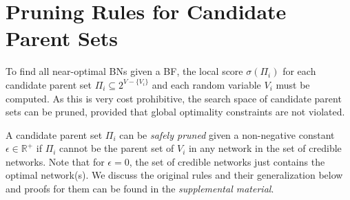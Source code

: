 \documentclass[letterpaper]{article}
\newcommand{\vertex}[1]{V_{#1}}
\newcommand{\vertices}{\mathit{V}}
\newcommand{\parents}{\Pi}
\begin{document}
\section{Pruning Rules for Candidate Parent Sets}\label{sec:pruning}

To find all near-optimal BNs given a BF, the local score $\sigma( \parents_{i} )$
for each candidate parent set
$\parents_{i} \subseteq 2^{\vertices - \{\vertex{i}\}}$
and each random variable $\vertex{i}$ must be computed. As this is very cost prohibitive, the search space of candidate parent sets can be pruned, provided that global optimality constraints are not violated. 





A candidate parent set $\Pi_i$ can be \textit{safely pruned} given a non-negative constant $\epsilon \in \mathbb{R}^+$ if $\Pi_i$ cannot be the parent set of $V_i$ in any network in the set of credible networks. Note that for $\epsilon=0$, the set of credible  networks just contains the optimal network(s). We discuss the original rules and their generalization below and proofs for them can be found in the \emph{supplemental material}.
\end{document}
